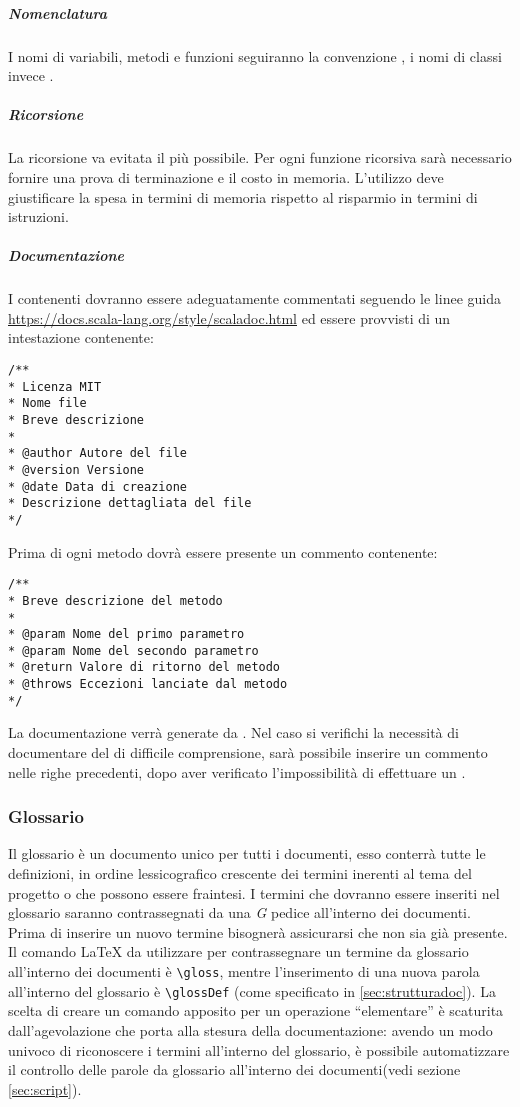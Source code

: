 \documentclass{scalatekids-article}
\begin{document}
\subparagraph{Nomenclatura}

I nomi di variabili, metodi e funzioni seguiranno la convenzione
\textit{}, i nomi di classi invece
\textit{}.
\subparagraph{Ricorsione}
La ricorsione va evitata il più possibile. Per ogni funzione ricorsiva sarà
necessario fornire una prova di terminazione e il costo in memoria. L'utilizzo
deve giustificare la spesa in termini di memoria rispetto al risparmio in
termini di istruzioni.

\subparagraph{Documentazione}

I  contenenti  dovranno essere adeguatamente commentati seguendo le
linee guida  \url{https://docs.scala-lang.org/style/scaladoc.html} ed essere provvisti di un
intestazione contenente:
\begin{lstlisting}
/**
* Licenza MIT
* Nome file
* Breve descrizione
*
* @author Autore del file
* @version Versione
* @date Data di creazione
* Descrizione dettagliata del file
*/
\end{lstlisting}
Prima di ogni metodo dovrà essere presente un commento  contenente:
\begin{lstlisting}
/**
* Breve descrizione del metodo
*
* @param Nome del primo parametro
* @param Nome del secondo parametro
* @return Valore di ritorno del metodo
* @throws Eccezioni lanciate dal metodo
*/
\end{lstlisting}
La documentazione verrà generate da . Nel caso si verifichi la
necessità di documentare del  di difficile comprensione, sarà possibile
inserire un commento nelle righe precedenti, dopo aver verificato
l'impossibilità di effettuare un .

\subsubsection{Glossario}

Il glossario è un documento unico per tutti i documenti, esso conterrà tutte le
definizioni, in ordine lessicografico crescente dei termini inerenti al tema
del progetto o che possono essere fraintesi. I termini che dovranno essere
inseriti nel glossario saranno contrassegnati da una \textit{G} pedice
all'interno dei documenti. Prima di inserire un nuovo termine bisognerà
assicurarsi che non sia già presente.\\ Il comando \LaTeX\xspace da utilizzare
per contrassegnare un termine da glossario all'interno dei documenti è
\verb=\gloss=, mentre l'inserimento di una nuova parola all'interno del
glossario è \verb=\glossDef= (come specificato in \ref{sec:strutturadoc}). La
scelta di creare un comando apposito per un operazione ``elementare'' è
scaturita dall'agevolazione che porta alla stesura della documentazione: avendo
un modo univoco di riconoscere i termini all'interno del glossario, è possibile
automatizzare il controllo delle parole da glossario all'interno dei
documenti(vedi sezione \ref{sec:script}).
\end{document}
